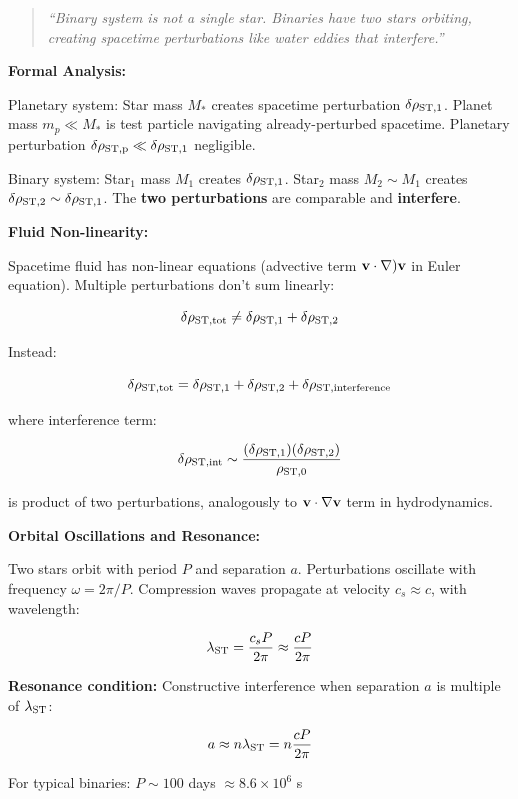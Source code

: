 \documentclass[10pt,a4paper]{article}
\begin{document}
\begin{quote}
\emph{``Binary system is not a single star. Binaries have two stars
orbiting, creating spacetime perturbations like water eddies that
interfere.''}
\end{quote}

\textbf{Formal Analysis:}

Planetary system: Star mass \(M_*\) creates spacetime perturbation
\(\delta \rho_{\rm ST,1}\). Planet mass \(m_p \ll M_*\) is test particle
navigating already-perturbed spacetime. Planetary perturbation
\(\delta \rho_{\rm ST,p} \ll \delta \rho_{\rm ST,1}\) negligible.

Binary system: Star$_{1}$ mass \(M_1\) creates \(\delta \rho_{\rm ST,1}\).
Star$_{2}$ mass \(M_2 \sim M_1\) creates
\(\delta \rho_{\rm ST,2} \sim \delta \rho_{\rm ST,1}\). The \textbf{two
perturbations} are comparable and \textbf{interfere}.

\textbf{Fluid Non-linearity:}

Spacetime fluid has non-linear equations (advective term
\({\bf v} \cdot \nabla){\bf v}\) in Euler equation). Multiple
perturbations don't sum linearly:

\[\delta \rho_{\rm ST,tot} \neq \delta \rho_{\rm ST,1} + \delta \rho_{\rm ST,2}\]

Instead:

\[\delta \rho_{\rm ST,tot} = \delta \rho_{\rm ST,1} + \delta \rho_{\rm ST,2} + \delta \rho_{\rm ST,interference}\]

where interference term:

\[\delta \rho_{\rm ST,int} \sim \frac{(\delta \rho_{\rm ST,1}) (\delta \rho_{\rm ST,2})}{\rho_{\rm ST,0}}\]

is product of two perturbations, analogously to
\({\bf v} \cdot \nabla {\bf v}\) term in hydrodynamics.

\textbf{Orbital Oscillations and Resonance:}

Two stars orbit with period \(P\) and separation \(a\). Perturbations
oscillate with frequency \(\omega = 2\pi/P\). Compression waves
propagate at velocity \(c_s \approx c\), with wavelength:

\[\lambda_{\rm ST} = \frac{c_s P}{2\pi} \approx \frac{c P}{2\pi}\]

\textbf{Resonance condition:} Constructive interference when separation
\(a\) is multiple of \(\lambda_{\rm ST}\):

\[a \approx n \lambda_{\rm ST} = n \frac{c P}{2\pi}\]

For typical binaries: \(P \sim 100\) days \(\approx 8.6 \times 10^6\) s
\end{document}
